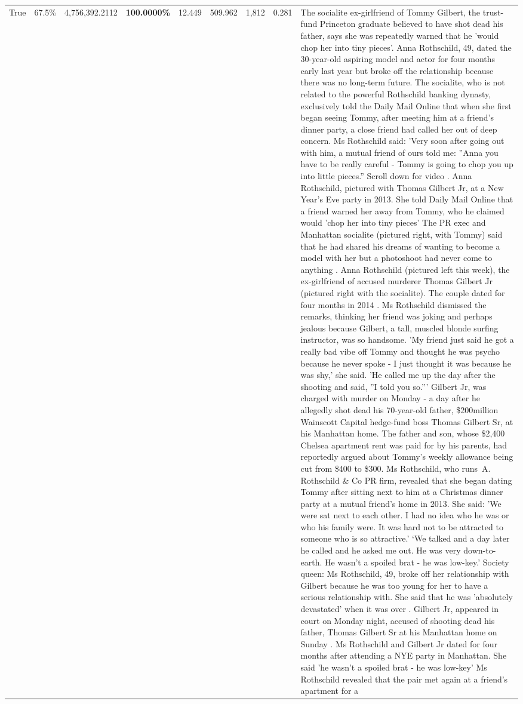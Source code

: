 \begin{table}[H]
\begin{tabular}{lllrlllll}
True & 67.5\% & 4,756,392.2112 & \bfseries \color{red} 100.0000\% & 12.449 & 509.962 & 1,812 & 0.281 & The socialite ex-girlfriend of Tommy Gilbert, the trust-fund Princeton graduate believed to have shot dead his father, says she was repeatedly warned that he 'would chop her into tiny pieces'. Anna Rothschild, 49, dated the 30-year-old aspiring model and actor for four months early last year but broke off the relationship because there was no long-term future. The socialite, who is not related to the powerful Rothschild banking dynasty, exclusively told the Daily Mail Online that when she first began seeing Tommy, after meeting him at a friend's dinner party, a close friend had called her out of deep concern. Ms Rothschild said: 'Very soon after going out with him, a mutual friend of ours told me: ''Anna you have to be really careful - Tommy is going to chop you up into little pieces.'' Scroll down for video . Anna Rothschild, pictured with Thomas Gilbert Jr, at a New Year's Eve party in 2013. She told Daily Mail Online that a friend warned her away from Tommy, who he claimed would 'chop her into tiny pieces' The PR exec and Manhattan socialite (pictured right, with Tommy) said that he had shared his dreams of wanting to become a model with her but a photoshoot had never come to anything . Anna Rothschild (pictured left this week), the ex-girlfriend of accused murderer Thomas Gilbert Jr (pictured right with the socialite). The couple dated for four months in 2014 . Ms Rothschild dismissed the remarks, thinking her friend was joking and perhaps jealous because Gilbert, a tall, muscled blonde surfing instructor, was so handsome. 'My friend just said he got a really bad vibe off Tommy and thought he was psycho because he never spoke - I just thought it was because he was shy,' she said. 'He called me up the day after the shooting and said, ''I told you so.''' Gilbert Jr, was charged with murder on Monday - a day after he allegedly shot dead his 70-year-old father, \$200million Wainscott Capital hedge-fund boss Thomas Gilbert Sr, at his Manhattan home. The father and son, whose \$2,400 Chelsea apartment rent was paid for by his parents, had reportedly argued about Tommy's weekly allowance being cut from \$400 to \$300. Ms Rothschild, who runs A. Rothschild \& Co PR firm, revealed that she began dating Tommy after sitting next to him at a Christmas dinner party at a mutual friend's home in 2013. She said: 'We were sat next to each other. I had no idea who he was or who his family were. It was hard not to be attracted to someone who is so attractive.' ‘We talked and a day later he called and he asked me out. He was very down-to-earth. He wasn’t a spoiled brat - he was low-key.’ Society queen: Ms Rothschild, 49, broke off her relationship with Gilbert because he was too young for her to have a serious relationship with. She said that he was 'absolutely devastated' when it was over . Gilbert Jr, appeared in court on Monday night, accused of shooting dead his father, Thomas Gilbert Sr at his Manhattan home on Sunday . Ms Rothschild and Gilbert Jr dated for four months after attending a NYE party in Manhattan. She said 'he wasn't a spoiled brat - he was low-key' Ms Rothschild revealed that the pair met again at a friend’s apartment for a 
\end{tabular}
\end{table}
